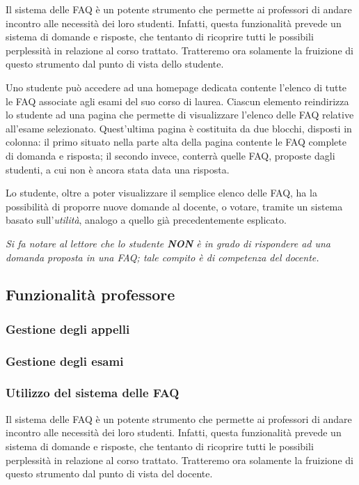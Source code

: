 \documentclass [a4paper,11pt]{book}
\begin{document}
Il sistema delle FAQ è un potente strumento che permette ai professori di andare incontro alle necessità dei loro studenti. Infatti, questa funzionalità prevede un sistema di domande e risposte, che tentanto di ricoprire tutti le possibili perplessità in relazione al corso trattato. Tratteremo ora solamente la fruizione di questo strumento dal punto di vista dello studente.

Uno studente può accedere ad una homepage dedicata contente l'elenco di tutte le FAQ associate agli esami del suo corso di laurea. Ciascun elemento reindirizza lo studente ad una pagina che permette di visualizzare l'elenco delle FAQ relative all'esame selezionato. Quest'ultima pagina è costituita da due blocchi, disposti in colonna: il primo situato nella parte alta della pagina contente le FAQ complete di domanda e risposta; il secondo invece, conterrà quelle FAQ, proposte dagli studenti, a cui non è ancora stata data una risposta.

Lo studente, oltre a poter visualizzare il semplice elenco delle FAQ, ha la possibilità di proporre nuove domande al docente, o votare, tramite un sistema basato sull'\emph{utilità}, analogo a quello già precedentemente esplicato. 

\emph{Si fa notare al lettore che lo studente \textbf{NON} è in grado di rispondere ad una domanda proposta in una FAQ; tale compito è di competenza del docente.}

\medskip

\subsection{Funzionalità professore}

\subsubsection{Gestione degli appelli}

\medskip

\subsubsection{Gestione degli esami}

\medskip

\subsubsection{Utilizzo del sistema delle FAQ}

Il sistema delle FAQ è un potente strumento che permette ai professori di andare incontro alle necessità dei loro studenti. Infatti, questa funzionalità prevede un sistema di domande e risposte, che tentanto di ricoprire tutti le possibili perplessità in relazione al corso trattato. Tratteremo ora solamente la fruizione di questo strumento dal punto di vista del docente.
\end{document}
